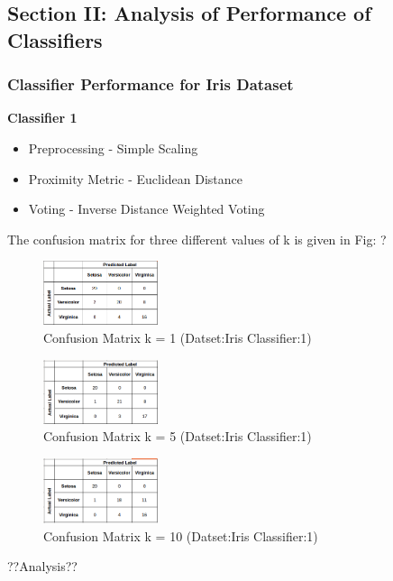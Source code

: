 \subsection{Section II: Analysis of Performance of Classifiers}
\subsubsection{Classifier Performance for Iris Dataset}
	\textbf{Classifier 1}\\
	\begin{itemize}
		\item Preprocessing - Simple Scaling
		\item Proximity Metric - Euclidean Distance
		\item Voting - Inverse Distance Weighted Voting
	\end{itemize}
	The confusion matrix for three different values of k is given in Fig: ?
	\begin{figure}[h]
			\label{fig:iris_k=1}
			\caption{Confusion Matrix k = 1 (Datset:Iris Classifier:1)}
			\centering
			\includegraphics[width=0.3\textwidth]{images/iris_k1.png}
	\end{figure}
	\begin{figure}[h]
		\label{fig:iris_k=5}
		\caption{Confusion Matrix k = 5 (Datset:Iris Classifier:1)}
		\centering
		\includegraphics[width=0.3\textwidth]{images/iris_k=5.png}
	\end{figure}
	\begin{figure}[h]
		\label{fig:iris_k=10}
		\caption{Confusion Matrix k = 10 (Datset:Iris Classifier:1)}
		\centering
		\includegraphics[width=0.3\textwidth]{images/iris_k=10.png}
	\end{figure}	
	??Analysis??\\
	
